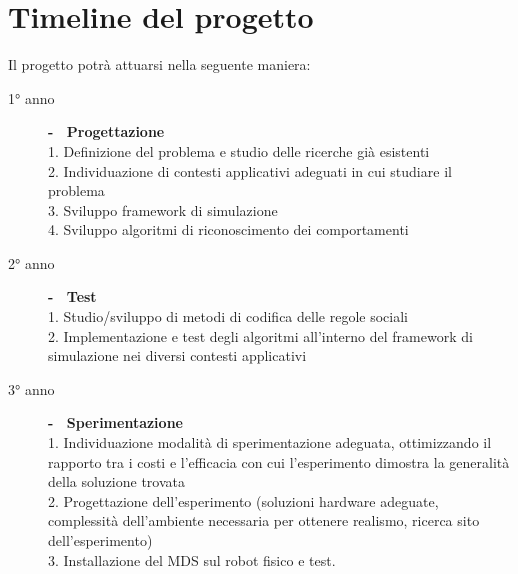 \documentclass[paper=a4, fontsize=11pt]{scrartcl} %
\numberwithin{equation}{section} %
\numberwithin{table}{section} %
\begin{document}
\section{Timeline del progetto}
Il progetto potrà attuarsi nella seguente maniera:
\begin{description}
\item[1° anno]\textbf{- \ Progettazione} \ \\
	1. Definizione del problema e studio delle ricerche già esistenti \\
	2. Individuazione di contesti applicativi adeguati in cui studiare il problema\\
	3. Sviluppo framework di simulazione\\
	4. Sviluppo algoritmi di riconoscimento dei comportamenti
\item[2° anno]\textbf{- \ Test} \ \\
	1. Studio/sviluppo di metodi di codifica delle regole sociali \\
	2. Implementazione e test degli algoritmi all'interno del framework
		di simulazione nei diversi contesti applicativi
\item[3° anno]\textbf{- \ Sperimentazione} \ \\
	1. Individuazione modalità di sperimentazione adeguata, ottimizzando 
	il rapporto tra i costi e l'efficacia con cui l'esperimento dimostra la generalità della soluzione trovata\\
	2. Progettazione dell'esperimento (soluzioni hardware adeguate,
	 complessità dell'ambiente necessaria per ottenere realismo, 
	 ricerca sito dell'esperimento)\\
	3. Installazione del MDS sul robot fisico e test.
	 
\end{description}


\end{document}
